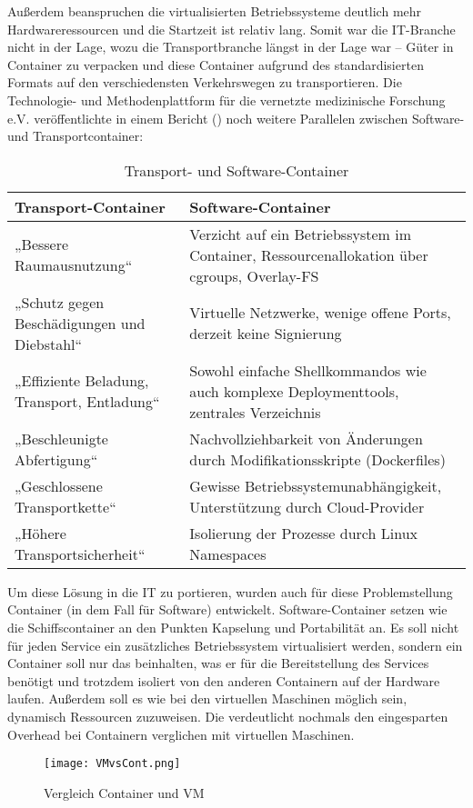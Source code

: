 Außerdem beanspruchen die virtualisierten Betriebssysteme deutlich mehr Hardwareressourcen und die Startzeit ist relativ lang.
Somit war die IT-Branche nicht in der Lage, wozu die Transportbranche längst in der Lage war -- Güter in Container zu verpacken und diese Container aufgrund des standardisierten Formats auf den verschiedensten Verkehrswegen zu transportieren. Die Technologie- und Methodenplattform für die vernetzte medizinische Forschung e.V. veröffentlichte in einem Bericht (\citep{TUM}) noch weitere Parallelen zwischen Software- und Transportcontainer:
\begin{table}[h]
\def\arraystretch{1.5}%
\begin{tabular}{|p{}|p{}|}\hline
	\textbf{Transport-Container} & \textbf{Software-Container} \\ \hline
	„Bessere Raumausnutzung“ & Verzicht auf ein Betriebssystem im Container, Ressourcenallokation über cgroups, Overlay-FS \\ \hline
	„Schutz gegen Beschädigungen und Diebstahl“ & Virtuelle Netzwerke, wenige offene Ports, derzeit keine Signierung \\ \hline
	„Effiziente Beladung, Transport, Entladung“ & Sowohl einfache Shellkommandos wie auch komplexe Deploymenttools, zentrales Verzeichnis \\ \hline
	„Beschleunigte Abfertigung“ & Nachvollziehbarkeit von Änderungen durch Modifikationsskripte (Dockerfiles) \\ \hline
	„Geschlossene Transportkette“ &Gewisse Betriebssystemunabhängigkeit, Unterstützung durch Cloud-Provider \\ \hline
	„Höhere Transportsicherheit“ & Isolierung der Prozesse durch Linux Namespaces \\ \hline
\end{tabular}
\caption{Transport- und Software-Container}
\end{table}

Um diese Lösung in die IT zu portieren, wurden auch für diese Problemstellung Container (in dem Fall für Software) entwickelt.
Software-Container setzen wie die Schiffscontainer an den Punkten Kapselung und Portabilität an.
Es soll nicht für jeden Service ein zusätzliches Betriebssystem virtualisiert werden, sondern ein Container soll nur das beinhalten, was er für die Bereitstellung des Services benötigt und trotzdem isoliert von den anderen Containern auf der Hardware laufen.
Außerdem soll es wie bei den virtuellen Maschinen möglich sein, dynamisch Ressourcen zuzuweisen. \citep{12005068320161201, redhat}
Die  verdeutlicht nochmals den eingesparten Overhead bei Containern verglichen mit virtuellen Maschinen.
\begin{figure}[H]
	\begin{center}
		\texttt{[image: VMvsCont.png]}
	\end{center}
	\caption[Vergleich Container und VM]{Vergleich Container und VM \footnotemark}
	\label{fig:VergleichContainerVM}
\end{figure}
\newpage


